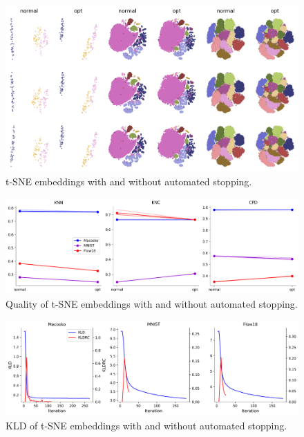 \begin{figure}[h]
    \centering 
        \includegraphics[width=\linewidth]{../code/figures/opt-SNE_embedding_grid_tab20b.png}
        \caption{t-SNE embeddings with and without automated stopping.}
    \label{fig:opt-SNE_grid}
\end{figure}

\begin{figure}[h]
    \centering 
        \includegraphics[width=\linewidth]{../code/figures/opt-SNE_3_quality_measures.png}
        \caption{Quality of t-SNE embeddings with and without automated stopping.}
    \label{fig:opt-SNE_quality}
\end{figure}

\begin{figure}[h]
    \centering 
        \includegraphics[width=\linewidth]{../code/figures/opt-SNE_kl_divergences_plot.png}
        \caption{KLD of t-SNE embeddings with and without automated stopping.}
    \label{fig:opt-SNE_kld}
\end{figure}